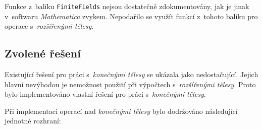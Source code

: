 \documentclass[thesis=M,czech,hidelinks]{FITthesis}[2012/06/26]
\newcommand{\0}{{\textcolor[gray]{0.75}{0}}}
\begin{document}
Funkce z~balíku \texttt{FiniteFields} nejsou dostatečně zdokumentovány, jak je
jinak v~softwaru \emph{Mathematica} zvykem. Nepodařilo se využít funkcí z~tohoto
balíku pro operace s~\emph{rozšířenými tělesy}.


\subsection{Zvolené řešení}\label{kap_zvolene_reseni}

Existující řešení pro práci s~\emph{konečnými tělesy} se ukázala jako
nedostačující. Jejich hlavní nevýhodou je nemožnost použití při výpočtech
s~\emph{rozšířenými tělesy}. Proto bylo implementováno vlastní řešení pro práci
s~\emph{konečnými tělesy}.

Při implementaci operací nad \emph{konečnými tělesy} bylo dodržováno následující
jednotné rozhraní:
\end{document}
